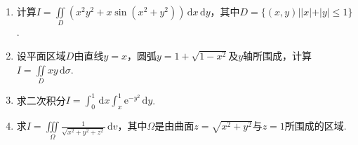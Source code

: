 \documentclass[../main.tex]{subfiles}
\begin{document}
\begin{enumerate}
    \item 计算$I=\iint\limits_{D}\left(x^{2}y^{2}+x\sin\left(x^{2}+y^{2}\right)\right
              )\,\mathrm{d}x\,\mathrm{d}y$，其中$D=\{(x,y)||x|+|y|\leq 1\}$.
          \vspace{12em}

    \item 设平面区域$D$由直线$y=x$，圆弧$y=1+\sqrt{1-x^{2}}$及$y$轴所围成，计算$I
              =\iint\limits_{D}xy\,\mathrm{d}\sigma$.
          \vspace{11em}

    \item 求二次积分$I=\int_{0}^{1}\,\mathrm{d}x\int_{x}^{1}\mathrm{e}^{-y^{2}}\,\mathrm{d}
              y$.
          \vspace{11em}

    \item 求$I=\iiint\limits_{\Omega}\frac{1}{\sqrt{x^{2}+y^{2}+z^{2}}}\,\mathrm{d}
              v$，其中$\Omega$是由曲面$z=\sqrt{x^{2}+y^{2}}$与$z=1$所围成的区域.
          \vspace{11em}
\end{enumerate}
\end{document}
